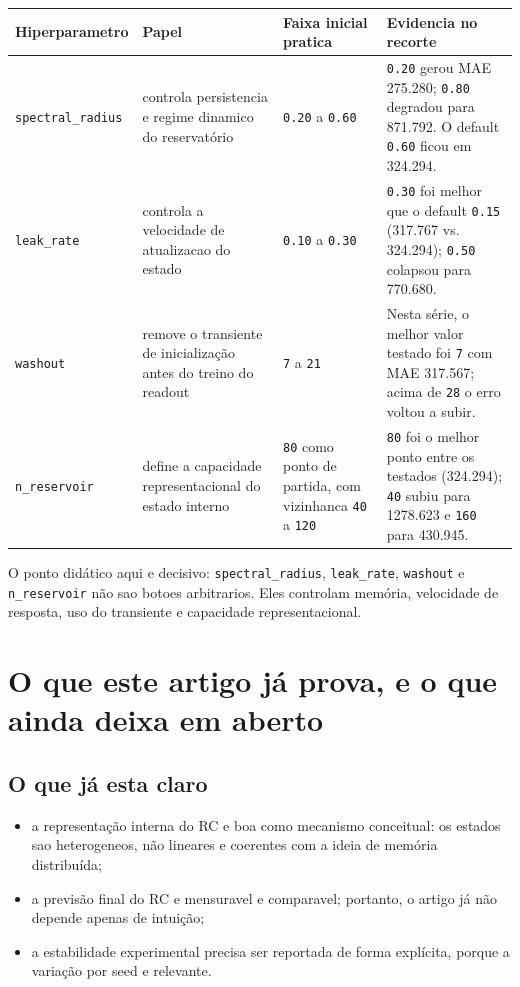 \documentclass[12pt]{article}
\providecommand{\tightlist}{%
              \setlength{\itemsep}{0pt}\setlength{\parskip}{0pt}}
\begin{document}
\begin{longtable}[]{@{}llll@{}}
\toprule\noalign{}
Hiperparametro & Papel & Faixa inicial pratica & Evidencia no recorte \\
\midrule\noalign{}
\endhead
\bottomrule\noalign{}
\endlastfoot
\texttt{spectral\_radius} & controla persistencia e regime dinamico do reservatório & \texttt{0.20} a \texttt{0.60} & \texttt{0.20} gerou MAE 275.280; \texttt{0.80} degradou para 871.792. O default \texttt{0.60} ficou em 324.294. \\
\texttt{leak\_rate} & controla a velocidade de atualizacao do estado & \texttt{0.10} a \texttt{0.30} & \texttt{0.30} foi melhor que o default \texttt{0.15} (317.767 vs. 324.294); \texttt{0.50} colapsou para 770.680. \\
\texttt{washout} & remove o transiente de inicialização antes do treino do readout & \texttt{7} a \texttt{21} & Nesta série, o melhor valor testado foi \texttt{7} com MAE 317.567; acima de \texttt{28} o erro voltou a subir. \\
\texttt{n\_reservoir} & define a capacidade representacional do estado interno & \texttt{80} como ponto de partida, com vizinhanca \texttt{40} a \texttt{120} & \texttt{80} foi o melhor ponto entre os testados (324.294); \texttt{40} subiu para 1278.623 e \texttt{160} para 430.945. \\
\end{longtable}

O ponto didático aqui e decisivo: \texttt{spectral\_radius}, \texttt{leak\_rate}, \texttt{washout} e \texttt{n\_reservoir} não sao botoes arbitrarios. Eles controlam memória, velocidade de resposta, uso do transiente e capacidade representacional.

\section{O que este artigo já prova, e o que ainda deixa em aberto}\label{14-o-que-este-artigo-juxe1-prova-e-o-que-ainda-deixa-em-aberto}

\subsection{O que já esta claro}\label{141-o-que-juxe1-esta-claro}

\begin{itemize}
\tightlist
\item
  a representação interna do RC e boa como mecanismo conceitual: os estados sao heterogeneos, não lineares e coerentes com a ideia de memória distribuída;
\item
  a previsão final do RC e mensuravel e comparavel; portanto, o artigo já não depende apenas de intuição;
\item
  a estabilidade experimental precisa ser reportada de forma explícita, porque a variação por seed e relevante.
\end{itemize}
\end{document}
